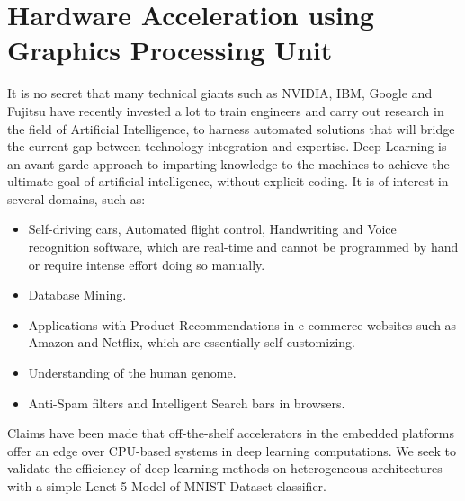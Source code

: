 \chapter{Hardware Acceleration using Graphics Processing Unit}
\label{ch4_cnn}
It is no secret that many technical giants such as NVIDIA, IBM, Google and Fujitsu have recently invested a lot to train engineers and carry out research in the field of Artificial Intelligence, to harness automated solutions that will bridge the current gap between technology integration and expertise. Deep Learning is an avant-garde approach to imparting knowledge to the machines to achieve the ultimate goal of artificial intelligence, without explicit coding. It is of interest in several domains\cite{wiki_ml}, such as:
\begin{itemize}
\item Self-driving cars, Automated flight control, Handwriting and Voice recognition software, which are real-time and cannot be programmed by hand or require intense effort doing so manually.
\item Database Mining.
\item Applications with Product Recommendations in e-commerce websites such as Amazon and Netflix, which are essentially self-customizing.
\item Understanding of the human genome.
\item Anti-Spam filters and Intelligent Search bars in browsers.
\end{itemize} 
Claims have been made that off-the-shelf accelerators in the embedded platforms offer an edge over CPU-based systems in deep learning computations\cite{hegde2016caffepresso}. We seek to validate the efficiency of deep-learning methods on heterogeneous architectures with a simple Lenet-5 Model of MNIST Dataset classifier. 
